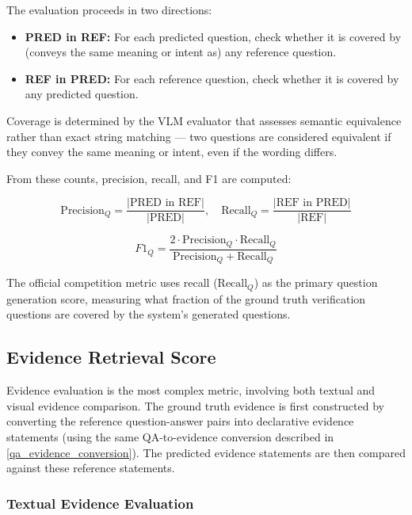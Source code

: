 The evaluation proceeds in two directions:

\begin{itemize}
    \item \textbf{PRED in REF:} For each predicted question, check whether it is covered by (conveys the same meaning or intent as) any reference question.
    \item \textbf{REF in PRED:} For each reference question, check whether it is covered by any predicted question.
\end{itemize}

Coverage is determined by the VLM evaluator that assesses semantic equivalence rather than exact string matching — two questions are considered equivalent if they convey the same meaning or intent, even if the wording differs.

From these counts, precision, recall, and F1 are computed:

\begin{equation}
    \text{Precision}_Q = \frac{|\text{PRED in REF}|}{|\text{PRED}|}, \quad \text{Recall}_Q = \frac{|\text{REF in PRED}|}{|\text{REF}|}
\end{equation}

\begin{equation}
    F1_Q = \frac{2 \cdot \text{Precision}_Q \cdot \text{Recall}_Q}{\text{Precision}_Q + \text{Recall}_Q}
\end{equation}

The official competition metric uses recall ($\text{Recall}_Q$) as the primary question generation score, measuring what fraction of the ground truth verification questions are covered by the system's generated questions.

\subsection{Evidence Retrieval Score}

Evidence evaluation is the most complex metric, involving both textual and visual evidence comparison. The ground truth evidence is first constructed by converting the reference question-answer pairs into declarative evidence statements (using the same QA-to-evidence conversion described  in \ref{qa_evidence_conversion}). The predicted evidence statements are then compared against these reference statements.

\subsubsection{Textual Evidence Evaluation}

